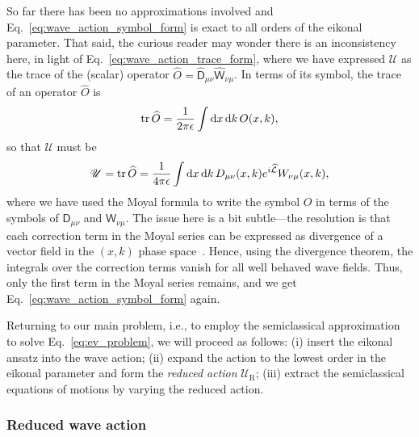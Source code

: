 So far there has been no approximations involved and Eq.~\eqref{eq:wave_action_symbol_form} is exact to all orders of the eikonal parameter.
That said, the curious reader may wonder there is an inconsistency here, in light of Eq.~\eqref{eq:wave_action_trace_form}, where we have expressed $\mathscr{U}$ as the trace of the (scalar) operator $\widehat{O} = \widehat{\mathsf{D}}_{\mu\nu}\widehat{\mathsf{W}}_{\nu\mu}$.
In terms of its symbol, the trace of an operator $\widehat{O}$ is
%
\begin{equation}
  \operatorname{tr}\widehat{O} = \frac{1}{2\pi\epsilon} \int \mathrm{d}{x}\,\mathrm{d}{k}\, O(x, k),
\end{equation}
%
so that $\mathscr{U}$ must be
%
\begin{equation}
  \mathscr{U} = \operatorname{tr}{\widehat{O}} = \frac{1}{4\pi\epsilon}\int \mathrm{d}{x}\,\mathrm{d}{k}\, D_{\mu\nu}(x,k)e^{i\widehat{\mathcal{L}}}W_{\nu\mu}(x, k),
\end{equation}
%
where we have used the Moyal formula to write the symbol $O$ in terms of the symbols of $\mathsf{D}_{\mu\nu}$ and $\mathsf{W}_{\nu\mu}$.
The issue here is a bit subtle---the resolution is that each correction term in the Moyal series can be expressed as divergence of a vector field in the $(x, k)$ phase space~\cite[Problem 3.16]{tracy2014}.
Hence, using the divergence theorem, the integrals over the correction terms vanish for all well behaved wave fields.
Thus, only the first term in the Moyal series remains, and we get Eq.~\eqref{eq:wave_action_symbol_form} again.

Returning to our main problem, i.e., to employ the semiclassical approximation to solve Eq.~\eqref{eq:ev_problem}, we will proceed as follows: (i) insert the eikonal ansatz into the wave action; (ii) expand the action to the lowest order in the eikonal parameter and form the \emph{reduced action} $\mathscr{U}_{\text{R}}$; (iii) extract the semiclassical equations of motions by varying the reduced action.

\subsubsection*{Reduced wave action}

